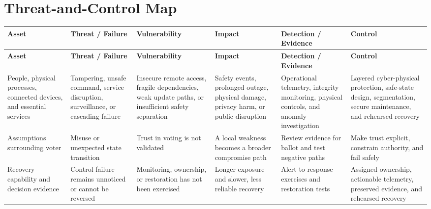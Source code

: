 \documentclass[11pt]{article}
\begin{document}
\section*{Threat-and-Control Map}
\begingroup\scriptsize\setlength{\tabcolsep}{2pt}
\begin{longtable}{>{\RaggedRight\arraybackslash}p{}>{\RaggedRight\arraybackslash}p{}>{\RaggedRight\arraybackslash}p{}>{\RaggedRight\arraybackslash}p{}>{\RaggedRight\arraybackslash}p{}>{\RaggedRight\arraybackslash}p{}}
\toprule\rowcolor{Navy}\color{white}\textbf{Asset} & \color{white}\textbf{Threat / Failure} & \color{white}\textbf{Vulnerability} & \color{white}\textbf{Impact} & \color{white}\textbf{Detection / Evidence} & \color{white}\textbf{Control}\\\midrule
\endfirsthead
\toprule\rowcolor{Navy}\color{white}\textbf{Asset} & \color{white}\textbf{Threat / Failure} & \color{white}\textbf{Vulnerability} & \color{white}\textbf{Impact} & \color{white}\textbf{Detection / Evidence} & \color{white}\textbf{Control}\\\midrule
\endhead
People, physical processes, connected devices, and essential services & Tampering, unsafe command, service disruption, surveillance, or cascading failure & Insecure remote access, fragile dependencies, weak update paths, or insufficient safety separation & Safety events, prolonged outage, physical damage, privacy harm, or public disruption & Operational telemetry, integrity monitoring, physical controls, and anomaly investigation & Layered cyber-physical protection, safe-state design, segmentation, secure maintenance, and rehearsed recovery\\\midrule
Assumptions surrounding voter & Misuse or unexpected state transition & Trust in voting is not validated & A local weakness becomes a broader compromise path & Review evidence for ballot and test negative paths & Make trust explicit, constrain authority, and fail safely\\\midrule
Recovery capability and decision evidence & Control failure remains unnoticed or cannot be reversed & Monitoring, ownership, or restoration has not been exercised & Longer exposure and slower, less reliable recovery & Alert-to-response exercises and restoration tests & Assigned ownership, actionable telemetry, preserved evidence, and rehearsed recovery\\\midrule
\bottomrule
\end{longtable}
\endgroup
\end{document}
